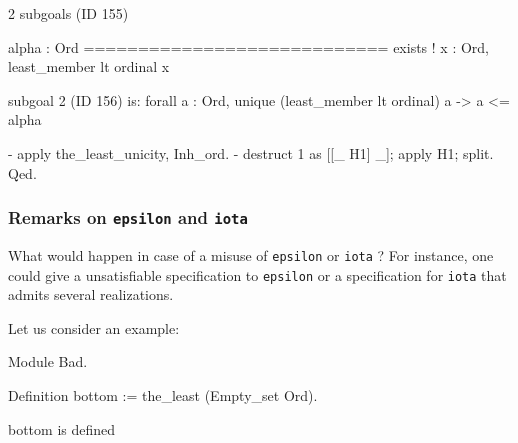 \documentclass[a4paper]{book}
\begin{document}
\begin{Coqanswer}
2 subgoals (ID 155)
  
  alpha : Ord
  ============================
  exists ! x : Ord, least_member lt ordinal x

subgoal 2 (ID 156) is:
 forall a : Ord, unique (least_member lt ordinal) a -> 
                a <= alpha
\end{Coqanswer}

\begin{Coqsrc}
  -  apply the_least_unicity, Inh_ord.
  -  destruct 1 as [[_ H1] _]; apply H1; split. 
Qed.
\end{Coqsrc}

\subsubsection{Remarks on \texttt{epsilon} and \texttt{iota}}

 What would happen in case of a misuse of \texttt{epsilon} or \texttt{iota} ?
For instance, one could give a unsatisfiable specification to \texttt{epsilon} or 
a specification for \texttt{iota} that admits several realizations.

Let us consider an example:

\begin{Coqbad}
Module Bad.

 Definition bottom := the_least (Empty_set Ord).
\end{Coqbad}

\begin{Coqanswer}
 bottom is defined
\end{Coqanswer}
\end{document}
